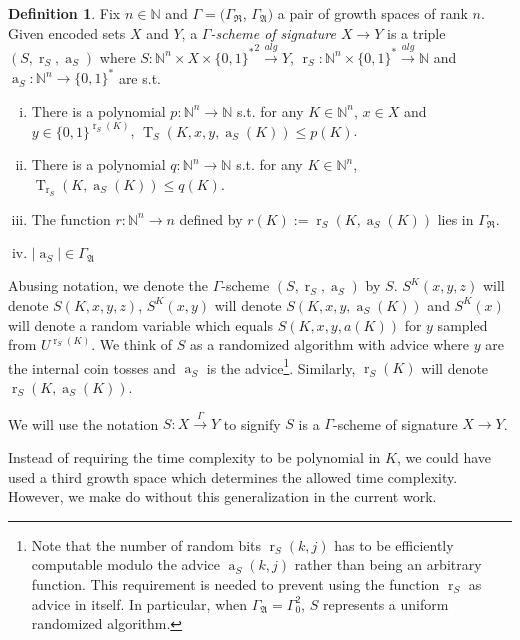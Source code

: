 \documentclass{article}
\numberwithin{equation}{section}
\theoremstyle{definition}
\newtheorem{definition}{Definition}[section]
\theoremstyle{plain}
\newcommand{\Words}{{\{ 0, 1 \}^*}}
\newcommand{\WordsLen}[1]{{\{ 0, 1 \}^{#1}}}
\DeclareMathOperator{\T}{T}
\DeclareMathOperator{\R}{r}
\DeclareMathOperator{\A}{a}
\newcommand{\Nats}{\mathbb{N}}
\newcommand{\Abs}[1]{\lvert #1 \rvert}
\begin{document}
\begin{definition}

Fix $n \in \Nats$ and $\Gamma=(\Gamma_{\mathfrak{R}}$, $\Gamma_{\mathfrak{A}})$ a pair of growth spaces of rank $n$. Given encoded sets $X$ and $Y$, a \emph{$\Gamma$-scheme of signature $X \rightarrow Y$} is a triple $(S,\R_S,\A_S)$ where $S: \Nats^n \times X \times \Words^2 \xrightarrow{alg} Y$, $\R_S: \Nats^n \times \Words \xrightarrow{alg} \Nats$ and $\A_S: \Nats^n \rightarrow \Words$ are s.t.

\begin{enumerate}[(i)]

\item There is a polynomial $p: \Nats^n \rightarrow \Nats$ s.t. for any $K \in \Nats^n$, $x \in X$ and $y \in \WordsLen{\R_S(K)}$, $\T_S(K,x,y,\A_S(K)) \leq p(K)$.

\item There is a polynomial $q: \Nats^n \rightarrow \Nats$ s.t. for any $K \in \Nats^n$, ${\T_{\R_S}(K,\A_S(K)) \leq q(K)}$.

\item The function $r: \Nats^n \rightarrow n$ defined by $r(K):=\R_S(K,\A_S(K))$ lies in $\Gamma_{\mathfrak{R}}$.

\item $\Abs{\A_S} \in \Gamma_{\mathfrak{A}}$

\end{enumerate}

Abusing notation, we denote the $\Gamma$-scheme $(S,\R_S,\A_S)$ by $S$. $S^K(x,y,z)$ will denote $S(K,x,y,z)$, $S^K(x,y)$ will denote $S(K,x,y,\A_S(K))$ and $S^K(x)$ will denote a random variable which equals $S(K,x,y,a(K))$ for $y$ sampled from $U^{\R_S(K)}$. We think of $S$ as a randomized algorithm with advice where $y$ are the internal coin tosses and $\A_S$ is the advice\footnote{Note that the number of random bits $\R_S(k,j)$ has to be efficiently computable modulo the advice $\A_S(k,j)$ rather than being an arbitrary function. This requirement is needed to prevent using the function $\R_S$ as advice in itself. In particular, when $\Gamma_{\mathfrak{A}}=\Gamma_0^2$, $S$ represents a uniform randomized algorithm.}. Similarly, $\R_S(K)$ will denote $\R_S(K,\A_S(K))$.

We will use the notation $S: X \xrightarrow{\Gamma} Y$ to signify $S$ is a $\Gamma$-scheme of signature $X \rightarrow Y$.

\end{definition}

Instead of requiring the time complexity to be polynomial in $K$, we could have used a third growth space which determines the allowed time complexity. However, we make do without this generalization in the current work.
\end{document}
